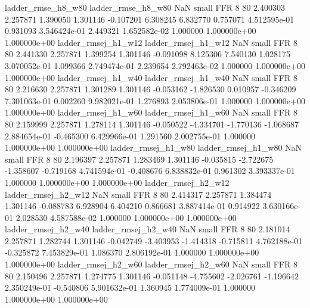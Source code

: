       ladder_rmse_h8_w80       ladder_rmse_h8_w80                   NaN      small      FFR                 8 80 2.400303       2.257871 1.390050       1.301146   -0.107201      6.308245      6.832770     0.757071   4.512595e-01  0.931093 3.546424e-01     2.449321   1.652582e-02            1.000000    1.000000e+00        1.000000e+00
     ladder_rmsej_h1_w12      ladder_rmsej_h1_w12                   NaN      small      FFR                 8 80 2.441330       2.257871 1.399254       1.301146   -0.091098      8.125306      7.540130     1.028175   3.070052e-01  1.099366 2.749474e-01     2.239654   2.792463e-02            1.000000    1.000000e+00        1.000000e+00
     ladder_rmsej_h1_w40      ladder_rmsej_h1_w40                   NaN      small      FFR                 8 80 2.216630       2.257871 1.301289       1.301146   -0.053162     -1.826530      0.010957    -0.346209   7.301063e-01  0.002260 9.982021e-01     1.276893   2.053806e-01            1.000000    1.000000e+00        1.000000e+00
     ladder_rmsej_h1_w60      ladder_rmsej_h1_w60                   NaN      small      FFR                 8 80 2.159999       2.257871 1.278114       1.301146   -0.050522     -4.334701     -1.770136    -1.068687   2.884654e-01 -0.465300 6.429966e-01     1.291560   2.002755e-01            1.000000    1.000000e+00        1.000000e+00
     ladder_rmsej_h1_w80      ladder_rmsej_h1_w80                   NaN      small      FFR                 8 80 2.196397       2.257871 1.283469       1.301146   -0.035815     -2.722675     -1.358607    -0.719168   4.741594e-01 -0.408676 6.838832e-01     0.961302   3.393337e-01            1.000000    1.000000e+00        1.000000e+00
     ladder_rmsej_h2_w12      ladder_rmsej_h2_w12                   NaN      small      FFR                 8 80 2.414317       2.257871 1.384474       1.301146   -0.088783      6.928904      6.404210     0.866681   3.887414e-01  0.914922 3.630166e-01     2.028530   4.587588e-02            1.000000    1.000000e+00        1.000000e+00
     ladder_rmsej_h2_w40      ladder_rmsej_h2_w40                   NaN      small      FFR                 8 80 2.181014       2.257871 1.282744       1.301146   -0.042749     -3.403953     -1.414318    -0.715811   4.762188e-01 -0.325872 7.453829e-01     1.086370   2.806192e-01            1.000000    1.000000e+00        1.000000e+00
     ladder_rmsej_h2_w60      ladder_rmsej_h2_w60                   NaN      small      FFR                 8 80 2.150496       2.257871 1.274775       1.301146   -0.051148     -4.755602     -2.026761    -1.196642   2.350249e-01 -0.540806 5.901632e-01     1.360945   1.774009e-01            1.000000    1.000000e+00        1.000000e+00

